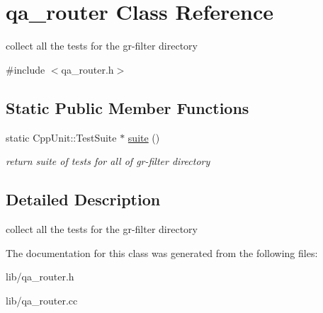 \hypertarget{classqa__router}{\section{qa\+\_\+router Class Reference}
\label{classqa__router}
}


collect all the tests for the gr-\/filter directory  




{\ttfamily \#include $<$qa\+\_\+router.\+h$>$}

\subsection*{Static Public Member Functions}
\begin{DoxyCompactItemize}
\item 
\hypertarget{classqa__router_ac2eaecbf6e0aa038c1d119c90f7eb7ef}{static Cpp\+Unit\+::\+Test\+Suite $\ast$ \hyperlink{classqa__router_ac2eaecbf6e0aa038c1d119c90f7eb7ef}{suite} ()}\label{classqa__router_ac2eaecbf6e0aa038c1d119c90f7eb7ef}

\begin{DoxyCompactList}\small\item\em return suite of tests for all of gr-\/filter directory \end{DoxyCompactList}\end{DoxyCompactItemize}


\subsection{Detailed Description}
collect all the tests for the gr-\/filter directory 

The documentation for this class was generated from the following files\+:\begin{DoxyCompactItemize}
\item 
lib/qa\+\_\+router.\+h\item 
lib/qa\+\_\+router.\+cc\end{DoxyCompactItemize}

